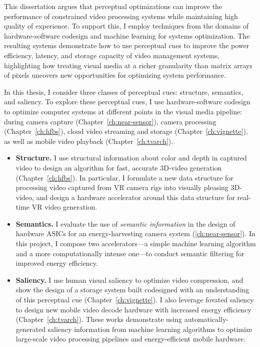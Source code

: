 This dissertation argues that perceptual optimizations can improve the performance of constrained video processing systems while maintaining high quality of experience.
To support this, I employ techniques from the domains of hardware-software codesign and machine learning for systems optimization.
The resulting systems demonstrate how to use perceptual cues to improve the power efficiency, latency, and storage capacity of video management systems, highlighting how treating visual media at a richer granularity than matrix arrays of pixels uncovers new opportunities for optimizing system performance.

In this thesis, I consider three classes of perceptual cues: structure, semantics, and saliency. To explore these perceptual cues, I use hardware-software codesign to optimize computer systems at different points in the visual media pipeline: during camera capture (Chapter~\ref{ch:near-sensor}), camera processing (Chapter~\ref{ch:hfbs}), cloud video streaming and storage (Chapter~\ref{ch:vignette}), as well as mobile video playback (Chapter~\ref{ch:tvarch}).

\begin{itemize}
\item \textbf{Structure.} I use structural information about color and depth in captured video to design an algorithm for fast, accurate 3D-\threesixty video generation (Chapter~\ref{ch:hfbs}).
In particular, I formulate a new data structure for processing video captured from VR camera rigs into visually pleasing 3D-\threesixty video, and design a hardware accelerator around this data structure for real-time VR video generation.

\item \textbf{Semantics.} I evaluate the use of \emph{semantic information} in the design of hardware ASICs for an energy-harvesting camera system (\ref{ch:near-sensor}).
In this project, I compose two accelerators---a simple machine learning algorithm and a more computationally intense one---to conduct semantic filtering for improved energy efficiency.

\item \textbf{Saliency.} I use human visual saliency to optimize video compression, and show the design of a storage system built codesigned with an understanding of this perceptual cue (Chapter~\ref{ch:vignette}).
I also leverage fovated saliency to design new mobile video decode hardware with increased energy efficiency (Chapter~\ref{ch:tvarch}).
These works demonstrate using automatically-generated saliency information from machine learning algorithms to optimize large-scale video processing pipelines and energy-efficient mobile hardware.
\end{itemize}


